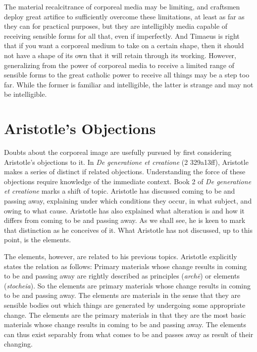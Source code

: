 The material recalcitrance of corporeal media may be limiting, and craftsmen deploy great artifice to sufficiently overcome these limitations, at least as far as they can for practical purposes, but they are intelligibly media capable of receiving sensible forms for all that, even if imperfectly. And Timaeus is right that if you want a corporeal medium to take on a certain shape, then it should not have a shape of its own that it will retain through its working. However, generalizing from the power of corporeal media to receive a limited range of sensible forms to the great catholic power to receive all things may be a step too far. While the former is familiar and intelligible, the latter is strange and may not be intelligible.


\section{Aristotle's Objections} %
\label{sec:aristotle_s_objections}

Doubts about the corporeal image are usefully pursued by first considering Aristotle's objections to it. In \emph{De generatione et creatione} (2 329a13ff), Aristotle makes a series of distinct if related objections. Understanding the force of these objections require knowledge of the immediate context. Book 2 of \emph{De generatione et creatione} marks a shift of topic. Aristotle has discussed coming to be and passing away, explaining under which conditions they occur, in what subject, and owing to what cause. Aristotle has also explained what alteration is and how it differs from coming to be and passing away. As we shall see, he is keen to mark that distinction as he conceives of it. What Aristotle has not discussed, up to this point, is the elements. 

The elements, however, are related to his previous topics. Aristotle explicitly states the relation as follows: Primary materials whose change results in coming to be and passing away are rightly described as principles (\emph{archē}) or elements (\emph{stocheia}). So the elements are primary materials whose change results in coming to be and passing away. The elements are materials in the sense that they are sensible bodies out which things are generated by undergoing some appropriate change. The elements are the primary materials in that they are the most basic materials whose change results in coming to be and passing away. The elements can thus exist separably from what comes to be and passes away as result of their changing.

